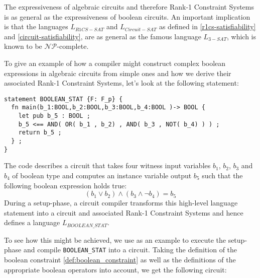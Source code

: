 The expressiveness of algebraic circuits and therefore Rank-1 Constraint Systems is as general as the expressiveness of boolean circuits. An important implication is that the languages $L_{R1CS-SAT}$ and $L_{Circuit-SAT}$ as defined in \ref{r1cs-satisfiability} and \ref{circuit-satisfiability}, are as general as the famous language $L_{3-SAT}$, which is known to be $\mathcal{NP}$-complete. 
\begin{example} To give an example of how a compiler might construct complex boolean expressions in algebraic circuits from simple ones and how we derive their associated Rank-1 Constraint Systems, let's look at the following  statement:
\begin{lstlisting}
statement BOOLEAN_STAT {F: F_p} {
  fn main(b_1:BOOL,b_2:BOOL,b_3:BOOL,b_4:BOOL )-> BOOL {
    let pub b_5 : BOOL ;
    b_5 <== AND( OR( b_1 , b_2) , AND( b_3 , NOT( b_4) ) ) ;
    return b_5 ;
  } ;
}
\end{lstlisting}
The code describes a circuit that takes four witness input variables $b_1$, $b_2$, $b_3$ and $b_4$ of boolean type and computes an instance variable output $b_5$ such that the following boolean expression holds true:
$$
\left( b_1 \vee b_2 \right) \wedge (b_3 \wedge \lnot b_4) = b_5
$$
During a setup-phase, a circuit compiler transforms this high-level language statement into a circuit and associated Rank-1 Constraint Systems and hence defines a  language $L_{BOOLEAN\_STAT}$. 

To see how this might be achieved, we use  as an example to execute the setup-phase and compile \texttt{BOOLEAN\_STAT} into a circuit. Taking the definition of the boolean constraint \ref{def:boolean_constraint} as well as the definitions of the appropriate boolean operators into account, we get the following circuit:
\begin{center}
\end{center}
\end{example}
